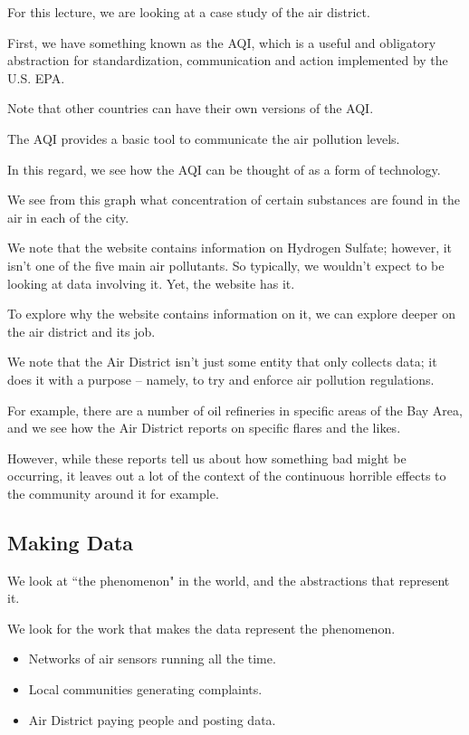 \documentclass[openany]{book}
\begin{document}
For this lecture, we are looking at a case study of the air district.

First, we have something known as the AQI, which is a useful and obligatory abstraction for standardization, communication and action implemented by the U.S. EPA.

Note that other countries can have their own versions of the AQI.

The AQI provides a basic tool to communicate the air pollution levels.

In this regard, we see how the AQI can be thought of as a form of technology.

We see from this graph what concentration of certain substances are found in the air in each of the city.

We note that the website contains information on Hydrogen Sulfate; however, it isn't one of the five main air pollutants. So typically, we wouldn't expect to be looking at data involving it. Yet, the website has it.

To explore why the website contains information on it, we can explore deeper on the air district and its job.

We note that the Air District isn't just some entity that only collects data; it does it with a purpose -- namely, to try and enforce air pollution regulations.

For example, there are a number of oil refineries in specific areas of the Bay Area, and we see how the Air District reports on specific flares and the likes.

However, while these reports tell us about how something bad might be occurring, it leaves out a lot of the context of the continuous horrible effects to the community around it for example.

\subsection{Making Data}
We look at ``the phenomenon" in the world, and the abstractions that represent it.

We look for the work that makes the data represent the phenomenon.
\begin{itemize}
	\item Networks of air sensors running all the time.
	\item Local communities generating complaints.
	\item Air District paying people and posting data.
\end{itemize}
\end{document}

